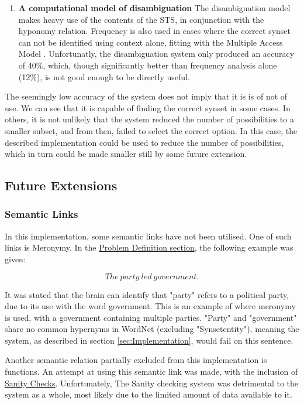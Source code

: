 \documentclass[]{article}
\begin{document}
\begin{enumerate}
		
	
	\item \textbf{A computational model of disambiguation} \newline
		The disambiguation model makes heavy use of the contents of the STS, in conjunction with the hyponomy relation. Frequency is also used in cases where the correct synset can not be identified using context alone, fitting with the Multiple Access Model \cite{PsychologyOfLanguage}. Unfortunatly, the disambiguation system only produced an accuracy of 40\%, which, though significantly better than frequency analysis alone (12\%), is not good enough to be directly useful. 
	

\end{enumerate}

The seemingly low accuracy of the system does not imply that it is is of not of use. We can see that it is capable of finding the correct synset in some cases. In others, it is not unlikely that the system reduced the number of possibilities to a smaller subset, and from then, failed to select the correct option. In this case, the described implementation could be used to reduce the number of possibilities, which in turn could be made smaller still by some future extension.


\subsection{Future Extensions}
\label{sec:ConcFuture}

\subsubsection{Semantic Links}
\label{sec:FutureSemantic}
In this implementation, some semantic links have not been utilised. One of such links is Meronymy. In the \hyperref[sec:ProbDef]{Problem Definition section}, the following example was given:

\[The\: party\: led\: government.\]

It was stated that the brain can identify that "party" refers to a political party, due to its use with the word government. This is an example of where meronymy is used, with a government containing multiple parties. "Party" and "government" share no common hypernyms in WordNet (excluding "Synset{entity}"), meaning the system, as described in section \ref{sec:Implementation}, would fail on this sentence. 

Another semantic relation partially excluded from this implementation is functions. An attempt at using this semantic link was made, with the inclusion of \hyperref[sec:Sanity]{Sanity Checks}. Unfortunately, The Sanity checking system was detrimental to the system as a whole, most likely due to the limited amount of data available to it.
\end{document}
